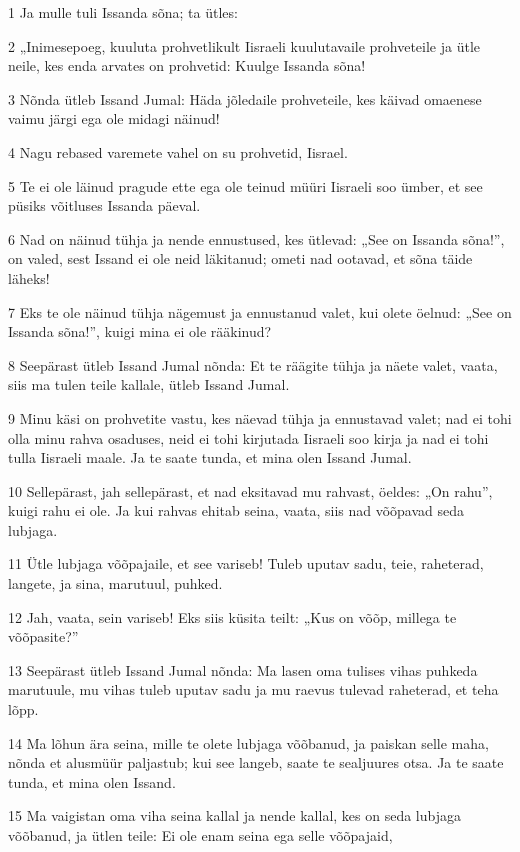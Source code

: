 \par 1 Ja mulle tuli Issanda sõna; ta ütles:
\par 2 „Inimesepoeg, kuuluta prohvetlikult Iisraeli kuulutavaile prohveteile ja ütle neile, kes enda arvates on prohvetid: Kuulge Issanda sõna!
\par 3 Nõnda ütleb Issand Jumal: Häda jõledaile prohveteile, kes käivad omaenese vaimu järgi ega ole midagi näinud!
\par 4 Nagu rebased varemete vahel on su prohvetid, Iisrael.
\par 5 Te ei ole läinud pragude ette ega ole teinud müüri Iisraeli soo ümber, et see püsiks võitluses Issanda päeval.
\par 6 Nad on näinud tühja ja nende ennustused, kes ütlevad: „See on Issanda sõna!”, on valed, sest Issand ei ole neid läkitanud; ometi nad ootavad, et sõna täide läheks!
\par 7 Eks te ole näinud tühja nägemust ja ennustanud valet, kui olete öelnud: „See on Issanda sõna!”, kuigi mina ei ole rääkinud?
\par 8 Seepärast ütleb Issand Jumal nõnda: Et te räägite tühja ja näete valet, vaata, siis ma tulen teile kallale, ütleb Issand Jumal.
\par 9 Minu käsi on prohvetite vastu, kes näevad tühja ja ennustavad valet; nad ei tohi olla minu rahva osaduses, neid ei tohi kirjutada Iisraeli soo kirja ja nad ei tohi tulla Iisraeli maale. Ja te saate tunda, et mina olen Issand Jumal.
\par 10 Sellepärast, jah sellepärast, et nad eksitavad mu rahvast, öeldes: „On rahu”, kuigi rahu ei ole. Ja kui rahvas ehitab seina, vaata, siis nad võõpavad seda lubjaga.
\par 11 Ütle lubjaga võõpajaile, et see variseb! Tuleb uputav sadu, teie, raheterad, langete, ja sina, marutuul, puhked.
\par 12 Jah, vaata, sein variseb! Eks siis küsita teilt: „Kus on võõp, millega te võõpasite?”
\par 13 Seepärast ütleb Issand Jumal nõnda: Ma lasen oma tulises vihas puhkeda marutuule, mu vihas tuleb uputav sadu ja mu raevus tulevad raheterad, et teha lõpp.
\par 14 Ma lõhun ära seina, mille te olete lubjaga võõbanud, ja paiskan selle maha, nõnda et alusmüür paljastub; kui see langeb, saate te sealjuures otsa. Ja te saate tunda, et mina olen Issand.
\par 15 Ma vaigistan oma viha seina kallal ja nende kallal, kes on seda lubjaga võõbanud, ja ütlen teile: Ei ole enam seina ega selle võõpajaid,
